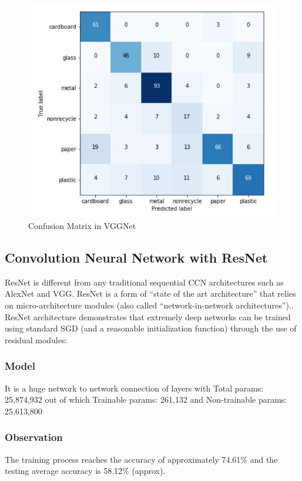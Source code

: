 \documentclass[10pt,twocolumn,letterpaper]{article}
\begin{document}
\begin{figure}[h!]
    \centering
    \includegraphics[scale=0.4]{pic/VGGCM.JPG}
    \caption{Confusion Matrix in VGGNet}
    \label{fig:Confusion Matrix in VGGNet}
\end{figure}

\subsection{Convolution Neural Network with ResNet}
ResNet is different from any traditional sequential CCN architectures such as AlexNet and VGG.\cite{ResNet} ResNet is a form of “state of the art architecture” that relies on micro-architecture modules (also called “network-in-network architectures”).\cite{internet}. ResNet architecture demonstrates that extremely deep networks can be trained using standard SGD (and a reasonable initialization function) through the use of residual modules:

\subsubsection{Model}
It is a huge network to network connection of layers with Total params: 25,874,932 out of which Trainable params: 261,132 and Non-trainable params: 25,613,800

\subsubsection{Observation}
The training process reaches the accuracy of approximately 74.61\% and the testing average accuracy is 58.12\% (approx).
\end{document}
